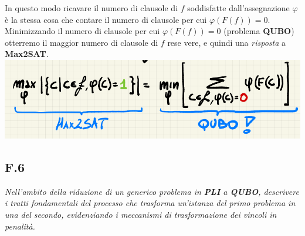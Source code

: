 \documentclass[a4paper]{article}
\begin{document}
In questo modo ricavare il numero di clausole di $f$ soddisfatte dall'assegnazione $\varphi$ è la stessa cosa che contare il numero di clausole per cui $\varphi(F(f)) = 0$.
Minimizzando il numero di clausole per cui $\varphi(F(f)) = 0$ (problema \textbf{QUBO}) otterremo il maggior numero di clausole di $f$ rese vere, e quindi una \textit{risposta} a \textbf{Max2SAT}.\\
\includegraphics[width = 1\textwidth]{./img/F5.png}
\subsection{F.6}
\emph{Nell’ambito della riduzione di un generico problema in \textbf{PLI} a \textbf{QUBO}, descrivere i tratti fondamentali del processo che trasforma un’istanza del primo problema in una del secondo, evidenziando i meccanismi di trasformazione dei vincoli in penalità.}
\end{document}
